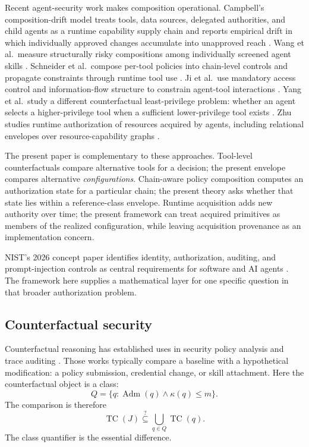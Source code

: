 \documentclass[11pt]{article}
\newcommand{\TC}{\operatorname{TC}}
\newcommand{\Adm}{\operatorname{Adm}}
\begin{document}
Recent agent-security work makes composition operational. Campbell's composition-drift model treats tools, data sources, delegated authorities, and child agents as a runtime capability supply chain and reports empirical drift in which individually approved changes accumulate into unapproved reach \cite{campbell2026}. Wang et al.\ measure structurally risky compositions among individually screened agent skills \cite{wang2026}. Schneider et al.\ compose per-tool policies into chain-level controls and propagate constraints through runtime tool use \cite{schneider2026}. Ji et al.\ use mandatory access control and information-flow structure to constrain agent-tool interactions \cite{ji2026}. Yang et al.\ study a different counterfactual least-privilege problem: whether an agent selects a higher-privilege tool when a sufficient lower-privilege tool exists \cite{yang2026}. Zhu studies runtime authorization of resources acquired by agents, including relational envelopes over resource-capability graphs \cite{zhu2026}.

The present paper is complementary to these approaches. Tool-level counterfactuals compare alternative tools for a decision; the present envelope compares alternative \emph{configurations}. Chain-aware policy composition computes an authorization state for a particular chain; the present theory asks whether that state lies within a reference-class envelope. Runtime acquisition adds new authority over time; the present framework can treat acquired primitives as members of the realized configuration, while leaving acquisition provenance as an implementation concern.

NIST's 2026 concept paper identifies identity, authorization, auditing, and prompt-injection controls as central requirements for software and AI agents \cite{booth2026}. The framework here supplies a mathematical layer for one specific question in that broader authorization problem.

\subsection{Counterfactual security}

Counterfactual reasoning has established uses in security policy analysis and trace auditing \cite{peralta2011,mccall2017,zhou2026}. Those works typically compare a baseline with a hypothetical modification: a policy submission, credential change, or skill attachment. Here the counterfactual object is a class:
\[
Q=\{q:\Adm(q)\land \kappa(q)\le m\}.
\]
The comparison is therefore
\[
\TC(J)\stackrel{?}{\subseteq}\bigcup_{q\in Q}\TC(q).
\]
The class quantifier is the essential difference.
\end{document}
